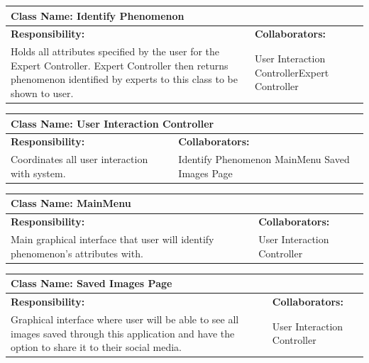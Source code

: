 \documentclass[]{article}
\begin{document}
	\begin{table}[!hb]
		\centering
		\begin{tabular}{|p{5cm}|p{5cm}|}
		\hline 
		 \multicolumn{2}{|l|}{\textbf{Class Name: Identify Phenomenon}} \\
		\hline
		\textbf{Responsibility:} & \textbf{Collaborators:} \\
		\hline
		Holds all attributes specified by the user for the Expert Controller. Expert Controller then returns phenomenon identified by experts to this class to be shown to user.  & User Interaction Controller\newline Expert Controller\\
		\hline
		\end{tabular}
	\end{table}
	
\pagebreak
	\begin{table}[!hb]
		\centering
		\begin{tabular}{|p{5cm}|p{5cm}|}
		\hline 
		 \multicolumn{2}{|l|}{\textbf{Class Name: User Interaction Controller}} \\
		\hline
		\textbf{Responsibility:} & \textbf{Collaborators:} \\
		\hline
		 Coordinates all user interaction with system. & Identify Phenomenon \newline MainMenu \newline Saved Images Page \\
		\hline
		\end{tabular}
	\end{table}


	\begin{table}[!hb]
		\centering
		\begin{tabular}{|p{5cm}|p{5cm}|}
		\hline 
		 \multicolumn{2}{|l|}{\textbf{Class Name: MainMenu}} \\
		\hline
		\textbf{Responsibility:} & \textbf{Collaborators:} \\
		\hline
		Main graphical interface that user will identify phenomenon's attributes with.  & User Interaction Controller \\
		\hline
		\end{tabular}
	\end{table}

	\begin{table}[!hb]
		\centering
		\begin{tabular}{|p{5cm}|p{5cm}|}
		\hline 
		 \multicolumn{2}{|l|}{\textbf{Class Name: Saved Images Page}} \\
		\hline
		\textbf{Responsibility:} & \textbf{Collaborators:} \\
		\hline
		Graphical interface where user will be able to see all images saved through this application and have the option to share it to their social media. & User Interaction Controller\\
		\hline
		\end{tabular}
	\end{table}
\end{document}
